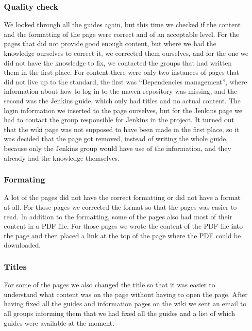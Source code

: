 \subsubsection{Quality check}
We looked through all the guides again, but this time we checked if the content and the formatting of the page were correct and of an acceptable level. For the pages that did not provide good enough content, but where we had the knowledge ourselves to correct it, we corrected them ourselves, and for the one we did not have the knowledge to fix, we contacted the groups that had written them in the first place. For content there were only two instances of pages that did not live up to the standard, the first was “Dependencies management”, where information about how to log in to the maven repository was missing, and the second was the Jenkins guide, which only had titles and no actual content. The login information we inserted to the page ourselves, but for the Jenkins page we had to contact the group responsible for Jenkins in the project. It turned out that the wiki page was not supposed to have been made in the first place, so it was decided that the page got removed, instead of writing the whole guide, because only the Jenkins group would have use of the information, and they already had the knowledge themselves.

\subsubsection{Formating}
A lot of the pages did not have the correct formatting or did not have a format at all. For those pages we corrected the format so that the pages was easier to read. In addition to the formatting, some of the pages also had most of their content in a PDF file. For those pages we wrote the content of the PDF file into the page and then placed a link at the top of the page where the PDF could be downloaded.

\subsubsection{Titles}
For some of the pages we also changed the title so that it was easier to understand what content was on the page without having to open the page.
After having fixed all the guides and information pages on the wiki we sent an email to all groups informing them that we had fixed all the guides and a list of which guides were available at the moment.

